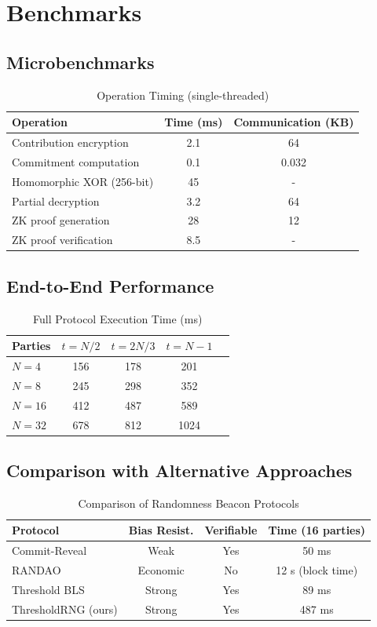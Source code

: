 \documentclass[11pt,a4paper]{article}
\begin{document}
\section{Benchmarks}

\subsection{Microbenchmarks}

\begin{table}[h]
\centering
\caption{Operation Timing (single-threaded)}
\begin{tabular}{@{}lcc@{}}
\toprule
Operation & Time (ms) & Communication (KB) \\
\midrule
Contribution encryption & 2.1 & 64 \\
Commitment computation & 0.1 & 0.032 \\
Homomorphic XOR (256-bit) & 45 & - \\
Partial decryption & 3.2 & 64 \\
ZK proof generation & 28 & 12 \\
ZK proof verification & 8.5 & - \\
\bottomrule
\end{tabular}
\end{table}

\subsection{End-to-End Performance}

\begin{table}[h]
\centering
\caption{Full Protocol Execution Time (ms)}
\begin{tabular}{@{}lcccc@{}}
\toprule
Parties & $t = N/2$ & $t = 2N/3$ & $t = N-1$ \\
\midrule
$N = 4$ & 156 & 178 & 201 \\
$N = 8$ & 245 & 298 & 352 \\
$N = 16$ & 412 & 487 & 589 \\
$N = 32$ & 678 & 812 & 1024 \\
\bottomrule
\end{tabular}
\end{table}

\subsection{Comparison with Alternative Approaches}

\begin{table}[h]
\centering
\caption{Comparison of Randomness Beacon Protocols}
\begin{tabular}{@{}lccc@{}}
\toprule
Protocol & Bias Resist. & Verifiable & Time (16 parties) \\
\midrule
Commit-Reveal & Weak & Yes & 50 ms \\
RANDAO & Economic & No & 12 s (block time) \\
Threshold BLS & Strong & Yes & 89 ms \\
ThresholdRNG (ours) & Strong & Yes & 487 ms \\
\bottomrule
\end{tabular}
\end{table}
\end{document}
